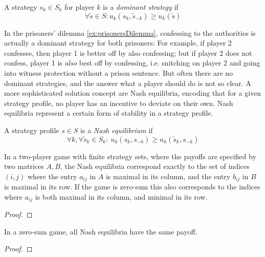 \documentclass[a4paper]{scrreprt}
\begin{document}
    \begin{defn}
        A strategy $s_k \in S_k$ for player $k$ is a \emph{dominant strategy} if 
        \[ \forall \tilde{s} \in S: u_k(s_k, \tilde{s}_{-k}) \geq u_k(\tilde{s}) \]
    \end{defn}
    
    In the prisoners' dilemma \ref{ex:prisonersDilemma}, confessing to the authorities is actually a dominant strategy for both prisoners:
    For example, if player 2 confesses, then player 1 is better off by also confessing; but if player 2 does not confess, player 1 is \emph{also} best off by confessing, i.e. snitching on player 2 and going into witness protection without a prison sentence.
    But often there are no dominant strategies, and the answer what a player should do is not so clear.
    A more sophisticated solution concept are Nash equilibria, encoding that for a given strategy profile, no player has an incentive to deviate on their own. Nash equilibria represent a certain form of stability in a strategy profile.
    
    \begin{defn}
        A strategy profile $s \in S$ is a \emph{Nash equilibrium} if
        \[
            \forall k, \forall \tilde{s}_k \in S_k:~ u_k(s_k, s_{-k}) \geq u_k(\tilde{s}_k, s_{-k})
        \]
        \label{def:nashEquilibriumRealValued}
    \end{defn}
    
    \begin{lemma} 
        In a two-player game with finite strategy sets, where the payoffs are specified by two matrices $A, B$, the Nash equilibria correspond
        exactly to the set of indices $(i, j)$ where the entry $a_{ij}$ in $A$ is maximal in its column, and the entry $b_{ij}$ in $B$ is maximal in its row.
        If the game is zero-sum this also corresponds to the indices where $a_{ij}$ is both maximal in its column, and minimal in its row.
    \end{lemma}
    \begin{proof}
    \end{proof}


    \begin{lemma}
        In a zero-sum game, all Nash equilibria have the same payoff.
    \end{lemma}
    \begin{proof}
    \end{proof}
    
\end{document}
